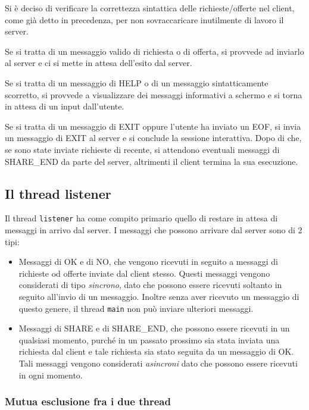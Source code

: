 \documentclass[a4paper,10pt]{article}
\begin{document}
Si \`e deciso di verificare la correttezza sintattica delle richieste/offerte nel client, come gi\`a detto in precedenza, per non sovraccaricare inutilmente di lavoro il server.

Se si tratta di un messaggio valido di richiesta o di offerta, si provvede ad inviarlo al server e ci si mette in attesa dell'esito dal server.

Se si tratta di un messaggio di HELP o di un messaggio sintatticamente scorretto, si provvede a visualizzare dei messaggi informativi a schermo e si torna in attesa di un input dall'utente.

Se si tratta di un messaggio di EXIT oppure l'utente ha inviato un EOF, si invia un messaggio di EXIT al server e si conclude la sessione interattiva. Dopo di che, se sono state inviate richieste di recente, si attendono eventuali messaggi di SHARE\_END da parte del server, altrimenti il client termina la sua esecuzione.

\subsection{Il thread listener}

Il thread \texttt{listener} ha come compito primario quello di restare in attesa di messaggi in arrivo dal server. I messaggi che possono arrivare dal server sono di 2 tipi:

\begin{itemize}
	\item Messaggi di OK e di NO, che vengono ricevuti in seguito a messaggi di richieste od offerte inviate dal client stesso. Questi messaggi vengono considerati di tipo \emph{sincrono}, dato che possono essere ricevuti soltanto in seguito all'invio di un messaggio. Inoltre senza aver ricevuto un messaggio di questo genere, il thread \texttt{main} non pu\`o inviare ulteriori messaggi.
	\item Messaggi di SHARE e di SHARE\_END, che possono essere ricevuti in un qualsiasi momento, purch\'e in un passato prossimo sia stata inviata una richiesta dal client e tale richiesta sia stato seguita da un messaggio di OK. Tali messaggi vengono considerati \textit{asincroni} dato che possono essere ricevuti in ogni momento.
\end{itemize}

\subsubsection{Mutua esclusione fra i due thread}
\end{document}
